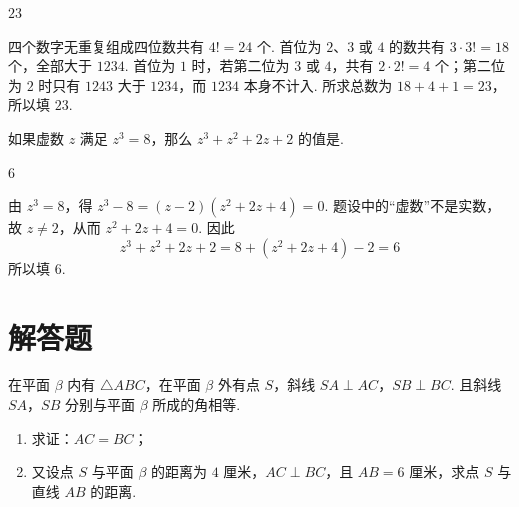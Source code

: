 \begin{answer}
\(23\)
\end{answer}

\begin{solution}
四个数字无重复组成四位数共有 \(4!=24\) 个. 首位为 \(2\)、\(3\) 或 \(4\) 的数共有 \(3\cdot3!=18\) 个，全部大于 \(1234\). 首位为 \(1\) 时，若第二位为 \(3\) 或 \(4\)，共有 \(2\cdot2!=4\) 个；第二位为 \(2\) 时只有 \(1243\) 大于 \(1234\)，而 \(1234\) 本身不计入. 所求总数为 \(18+4+1=23\)，所以填 \(23\).
\end{solution}

\begin{problem}
如果虚数 \(z\) 满足 \(z^3=8\)，那么 \(z^3+z^2+2z+2\) 的值是\fillinblank{}.
\end{problem}

\begin{answer}
\(6\)
\end{answer}

\begin{solution}
由 \(z^3=8\)，得
\(z^3-8=(z-2)(z^2+2z+4)=0\). 题设中的“虚数”不是实数，故 \(z\neq2\)，从而 \(z^2+2z+4=0\). 因此
\[
z^3+z^2+2z+2
=8+(z^2+2z+4)-2
=6
\]
所以填 \(6\).
\end{solution}

\section{解答题}

\begin{problem}
在平面 \(\beta\) 内有 \(\triangle ABC\)，在平面 \(\beta\) 外有点 \(S\)，斜线 \(SA\perp AC\)，\(SB\perp BC\). 且斜线 \(SA\)，\(SB\) 分别与平面 \(\beta\) 所成的角相等.

\begin{enumerate}
\item 求证：\(AC=BC\)；
\item 又设点 \(S\) 与平面 \(\beta\) 的距离为 \(4\text{ 厘米}\)，\(AC\perp BC\)，且 \(AB=6\text{ 厘米}\)，求点 \(S\) 与直线 \(AB\) 的距离.
\end{enumerate}
\end{problem}

